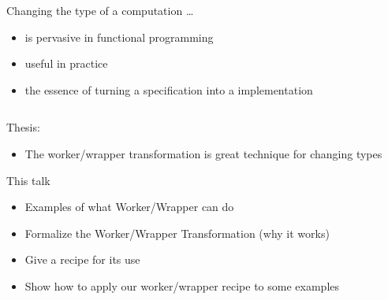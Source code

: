 \documentclass[smaller]{beamer}
\begin{document}
\begin{frame}
\begin{columns}[t] 
\begin{column}{0.8\textwidth}
\begin{block}{Changing the type of a computation \ldots}
\begin{itemize} 
\item is pervasive in functional programming
\item useful in practice
\item the essence of turning a specification into a implementation
\end{itemize} 
\end{block}
\end{column}
\end{columns}
\vskip 0.2in
Thesis:

\begin{itemize} 
\item The worker/wrapper transformation is great technique for changing types
\end{itemize}
\vskip 0.2in

This talk
\begin{itemize}
\item Examples of \alert{what} Worker/Wrapper can do
\item Formalize the Worker/Wrapper Transformation (\alert{why} it works)
\item Give a recipe for its use
\item Show \alert{how} to apply our worker/wrapper recipe to some examples
\end{itemize}
\end{frame}
\end{document}
